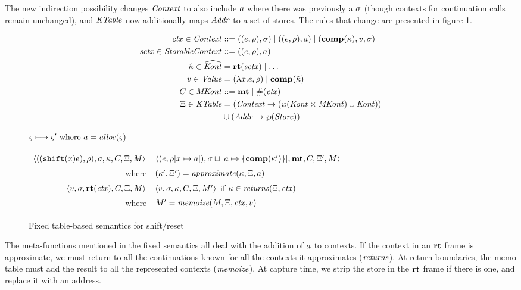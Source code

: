 \documentclass{llncs}
\begin{document}
The new indirection possibility changes $\mathit{Context}$ to also include
$a$ where there was previously a $\sigma$ (though contexts for
continuation calls remain unchanged), and $\mathit{KTable}$ now additionally
maps $\mathit{Addr}$ to a set of stores. The rules that change are presented in figure \ref{fig:shift-reset-table1}.

\begin{align*}
  \mathit{ctx} \in \mathit{Context} &::= ((e,\rho),\sigma) \mid ((e,\rho),a) \mid (\mathbf{comp}(\kappa),v,\sigma) \\
  \mathit{sctx} \in \mathit{StorableContext} &::= ((e,\rho),a) \\
  \hat{\kappa} \in \widehat{\mathit{Kont}} &= \mathbf{rt}(\mathit{sctx}) \mid \ldots \\
  v \in \mathit{Value} &= (\lambda{} x. e, \rho) \mid \mathbf{comp}(\hat{\kappa}) \\
  C \in \mathit{MKont} &::= \mathbf{mt} \mid \#(\mathit{ctx}) \\
  \Xi \in \mathit{KTable} &= (\mathit{Context} \to (\wp(\mathit{Kont} \times \mathit{MKont}) \cup \mathit{Kont})) \\
                   &\cup (\mathit{Addr} \to \wp(\mathit{Store}))
\end{align*}

\begin{figure}
  \centering
  $\varsigma \longmapsto \varsigma' \text{ where } a = \mathit{alloc}(\varsigma)$ \\
  \begin{tabular}{r|l}
    \hline
    $\langle ((\texttt{shift} (x) e), \rho), \sigma, \kappa, C, \Xi, M \rangle$
    &
    $\langle (e, \rho[x \mapsto a]), \sigma\sqcup[a \mapsto \{ \mathbf{comp}(\kappa') \}],\mathbf{mt},C,\Xi',M \rangle$
    \\
    where & $(\kappa',\Xi') = \mathit{approximate}(\kappa, \Xi, a)$
\\
   $\langle v, \sigma, \mathbf{rt}(\mathit{ctx}), C, \Xi, M \rangle$
   &
   $\langle v, \sigma, \kappa, C, \Xi, M' \rangle$
   if $\kappa \in \mathit{returns}(\Xi, \mathit{ctx})$
   \\
   where & $M' = \mathit{memoize}(M, \Xi, \mathit{ctx}, v)$
  \end{tabular}
  \caption{Fixed table-based semantics for shift/reset}
  \label{fig:shift-reset-table1}
\end{figure}

The meta-functions mentioned in the fixed semantics all deal with the
addition of $a$ to contexts. If the context in an $\mathbf{rt}$ frame is
approximate, we must return to all the continuations known for all the
contexts it approximates ($\mathit{returns}$). At return boundaries, the memo
table must add the result to all the represented contexts
($\mathit{memoize}$). At capture time, we strip the store in the $\mathbf{rt}$ frame
if there is one, and replace it with an address.
\end{document}
